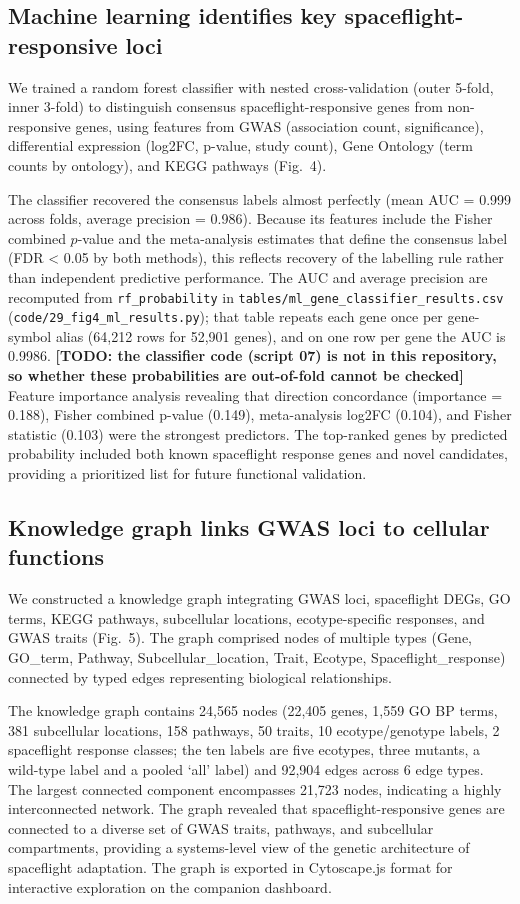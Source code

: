 \documentclass[sn-mathphys-num,Basic]{sn-jnl}
\begin{document}
\subsection{Machine learning identifies key spaceflight-responsive loci}

We trained a random forest classifier with nested cross-validation (outer 5-fold, inner 3-fold) to distinguish consensus spaceflight-responsive genes from non-responsive genes, using features from GWAS (association count, significance), differential expression (log2FC, p-value, study count), Gene Ontology (term counts by ontology), and KEGG pathways (Fig.~4).

The classifier recovered the consensus labels almost perfectly (mean AUC = 0.999 across folds, average precision = 0.986). Because its features include the Fisher combined $p$-value and the meta-analysis estimates that define the consensus label (FDR < 0.05 by both methods), this reflects recovery of the labelling rule rather than independent predictive performance. The AUC and average precision are recomputed from \texttt{rf\_probability} in \texttt{tables/ml\_gene\_classifier\_results.csv} (\texttt{code/29\_fig4\_ml\_results.py}); that table repeats each gene once per gene-symbol alias (64,212 rows for 52,901 genes), and on one row per gene the AUC is 0.9986. \textbf{[TODO: the classifier code (script 07) is not in this repository, so whether these probabilities are out-of-fold cannot be checked]} Feature importance analysis revealing that direction concordance (importance = 0.188), Fisher combined p-value (0.149), meta-analysis log2FC (0.104), and Fisher statistic (0.103) were the strongest predictors. The top-ranked genes by predicted probability included both known spaceflight response genes and novel candidates, providing a prioritized list for future functional validation.

\subsection{Knowledge graph links GWAS loci to cellular functions}

We constructed a knowledge graph integrating GWAS loci, spaceflight DEGs, GO terms, KEGG pathways, subcellular locations, ecotype-specific responses, and GWAS traits (Fig.~5). The graph comprised nodes of multiple types (Gene, GO\_term, Pathway, Subcellular\_location, Trait, Ecotype, Spaceflight\_response) connected by typed edges representing biological relationships.

The knowledge graph contains 24,565 nodes (22,405 genes, 1,559 GO BP terms, 381 subcellular locations, 158 pathways, 50 traits, 10 ecotype/genotype labels, 2 spaceflight response classes; the ten labels are five ecotypes, three mutants, a wild-type label and a pooled `all' label) and 92,904 edges across 6 edge types. The largest connected component encompasses 21,723 nodes, indicating a highly interconnected network. The graph revealed that spaceflight-responsive genes are connected to a diverse set of GWAS traits, pathways, and subcellular compartments, providing a systems-level view of the genetic architecture of spaceflight adaptation. The graph is exported in Cytoscape.js format for interactive exploration on the companion dashboard.
\end{document}
